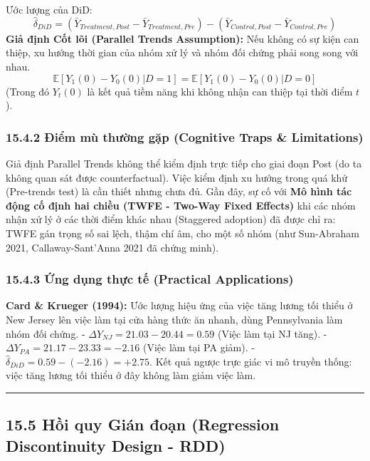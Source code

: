 \documentclass[
]{article}
\begin{document}
Ước lượng của DiD:
\[ \hat{\delta}_{DiD} = (\bar{Y}_{Treatment, Post} - \bar{Y}_{Treatment, Pre}) - (\bar{Y}_{Control, Post} - \bar{Y}_{Control, Pre}) \]
\textbf{Giả định Cốt lõi (Parallel Trends Assumption):} Nếu không có sự
kiện can thiệp, xu hướng thời gian của nhóm xử lý và nhóm đối chứng phải
song song với nhau.
\[ \mathbb{E}[Y_1(0) - Y_0(0) | D=1] = \mathbb{E}[Y_1(0) - Y_0(0) | D=0] \]
(Trong đó \(Y_t(0)\) là kết quả tiềm năng khi không nhận can thiệp tại
thời điểm \(t\)).

\subsubsection{15.4.2 Điểm mù thường gặp (Cognitive Traps \&
Limitations)}\label{ux111iux1ec3m-muxf9-thux1b0ux1eddng-gux1eb7p-cognitive-traps-limitations-100}

Giả định Parallel Trends không thể kiểm định trực tiếp cho giai đoạn
Post (do ta không quan sát được counterfactual). Việc kiểm định xu hướng
trong quá khứ (Pre-trends test) là cần thiết nhưng chưa đủ. Gần đây, sự
cố với \textbf{Mô hình tác động cố định hai chiều (TWFE - Two-Way Fixed
Effects)} khi các nhóm nhận xử lý ở các thời điểm khác nhau (Staggered
adoption) đã được chỉ ra: TWFE gán trọng số sai lệch, thậm chí âm, cho
một số nhóm (như Sun-Abraham 2021, Callaway-Sant'Anna 2021 đã chứng
minh).

\subsubsection{15.4.3 Ứng dụng thực tế (Practical
Applications)}\label{ux1ee9ng-dux1ee5ng-thux1ef1c-tux1ebf-practical-applications-56}

\textbf{Card \& Krueger (1994):} Ước lượng hiệu ứng của việc tăng lương
tối thiểu ở New Jersey lên việc làm tại cửa hàng thức ăn nhanh, dùng
Pennsylvania làm nhóm đối chứng. -
\(\Delta Y_{NJ} = 21.03 - 20.44 = 0.59\) (Việc làm tại NJ tăng). -
\(\Delta Y_{PA} = 21.17 - 23.33 = -2.16\) (Việc làm tại PA giảm). -
\(\hat{\delta}_{DiD} = 0.59 - (-2.16) = +2.75\). Kết quả ngược trực giác
vi mô truyền thống: việc tăng lương tối thiểu ở đây không làm giảm việc
làm.

\begin{center}\rule{0.5\linewidth}{0.5pt}\end{center}

\subsection{15.5 Hồi quy Gián đoạn (Regression Discontinuity Design -
RDD)}\label{hux1ed3i-quy-giuxe1n-ux111oux1ea1n-regression-discontinuity-design---rdd}
\end{document}
